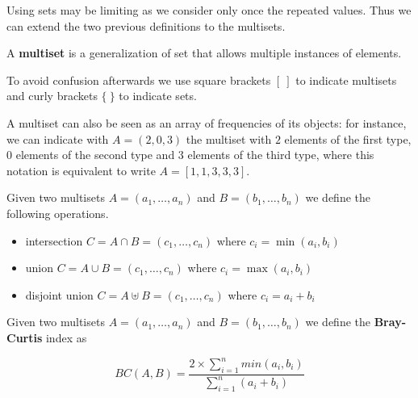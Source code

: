 Using sets may be limiting as we consider only once the repeated values. Thus we can extend the two previous definitions to the multisets.\medskip

\begin{definizione}
	A \textbf{multiset} is a generalization of set that allows multiple instances of elements.
\end{definizione}

To avoid confusion afterwards we use square brackets $[\ ]$ to indicate multisets and curly brackets $\{\ \}$ to indicate sets.\medskip

A multiset can also be seen as an array of frequencies of its objects: for instance, we can indicate with $A = (2, 0, 3)$ the multiset with $2$ elements of the first type, $0$ elements of the second type and $3$ elements of the third type, where this notation is equivalent to write $A = [1, 1, 3, 3, 3]$.\medskip

Given two multisets $A = (a_{1}, \ldots, a_{n}) $ and $B = (b_{1}, \ldots, b_{n})$ we define the following operations.

\begin{itemize}
	\item intersection $C = A \cap B  = (c_{1}, \ldots, c_{n})$ where $c_{i} = \min(a_{i}, b_{i})$
	\item union $C = A \cup B  = (c_{1}, \ldots, c_{n})$ where $c_{i} = \max(a_{i}, b_{i})$
	\item disjoint union $C = A \uplus B  = (c_{1}, \ldots, c_{n})$ where $c_{i} = a_{i} + b_{i}$
\end{itemize}

%     


\begin{definizione}\label{def:wbray}
	Given two multisets $A = (a_{1}, \ldots, a_{n}) $ and $B = (b_{1}, \ldots, b_{n})$ we define the \textbf{Bray-Curtis} index as
	
	\begin{equation}
	BC(A,B) = \frac{ 2 \times \sum\limits_{i=1}^n { min(a_{i}, b_{i}) } }{\sum\limits_{i=1}^n {(a_{i} + b_{i})}}
	\end{equation}
	
\end{definizione}

